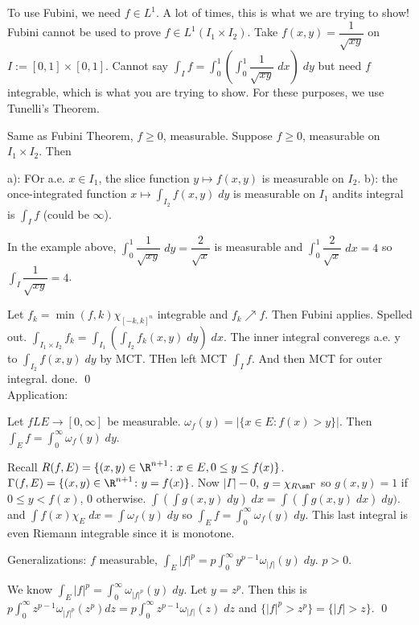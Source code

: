 To use Fubini, we need $f \in L^1$. A lot of times, this is what we are trying to show! Fubini cannot be used to prove $f \in L^1(I_1 \times I_2)$. Take $f(x,y)= \dfrac{1}{\sqrt{xy}}$ on $I:=[0,1] \times [0,1]$. Cannot say $\int_I f = \int_0^1( \int_0^1 \dfrac{1}{\sqrt{xy}} \; dx)\;dy$ but need $f$ integrable, which is what you are trying to show. For these purposes, we use Tunelli's Theorem.

\begin{thm}
Same as Fubini Theorem, $f \geq 0$, measurable. Suppose $f \geq 0$, measurable on $I_1 \times I_2$. Then 

a): FOr a.e. $x \in I_1$, the slice function $y \mapsto f(x,y)$ is measurable on $I_2$.
b): the once-integrated function $x \mapsto \int_{I_2} f(x,y) \; dy$ is measurable on $I_1$ andits integral is $\int_I f$ (could be $\infty$). 
\end{thm}


In the example above, $\int_0^1 \dfrac{1}{\sqrt{xy}} \; dy= \dfrac{2}{\sqrt{x}}$ is measurable and $\int_0^1 \dfrac{2}{\sqrt{x}} \; dx = 4$ so $\int_I \dfrac{1}{\sqrt{xy}}= 4$. 

\pf Let $f_k= \min(f,k) \chi_{[-k,k]^n}$ integrable and $f_k \nearrow f$. Then Fubini applies. Spelled out. $\int_{I_1 \times I_2} f_k = \int_{I_1} \left( \int_{I_2} f_k(x,y) \; dy \right) \; dx$. The inner integral converegs a.e. y to $\int_{I_2} f(x,y) \; dy$ by MCT. THen left MCT $\int_I f$. And then MCT for outer integral. done. \qed \\


Application: 

Let $fL E \to [0,\infty]$ be measurable. $\omega_f(y)= |\{x \in E \colon f(x)>y\}|$. Then $\int_E f = \int_0^\infty \omega_f(y) \; dy$. 

\pf Recall $R(f,E)= \{(x,y) \in \R^{n+1} \colon x \in E, 0 \leq y \leq f(x)\}$. $\Gamma(f,E)= \{(x,y) \in \R^{n+1} \colon y=f(x)\}$. Now $|\Gamma|-0$, $g= \chi_{R \sm \Gamma}$ so $g(x,y)=1$ if $0 \leq y<f(x)$, 0 otherwise. $\int(\int g(x,y) \; dy)\;dx= \int(\int g(x,y) \; dx) \; dy)$. and $\int f(x) \chi_E \; dx = \int \omega_f(y) \; dy$ so $\int_E f= \int_0^\infty \omega_f(y) \; dy$. This last integral is even Riemann integrable since it is monotone. 



Generalizations: $f$ measurable, $\int_E |f|^p= p \int_0^\infty y^{p-1} \omega_{|f|}(y) \; dy$. $p>0$.

We know $\int_E |f|^p= \int_0^\infty \omega_{|f|^p}(y) \; dy$. Let $y=z^p$. Then this is $p \int_0^\infty z^{p-1} \omega_{|f|^p}(z^p) dz= p \int_0^\infty z^{p-1} \omega_{|f|}(z)\;dz$ and $\{ |f|^p>z^p\}= \{|f|>z\}$. \qed \\





